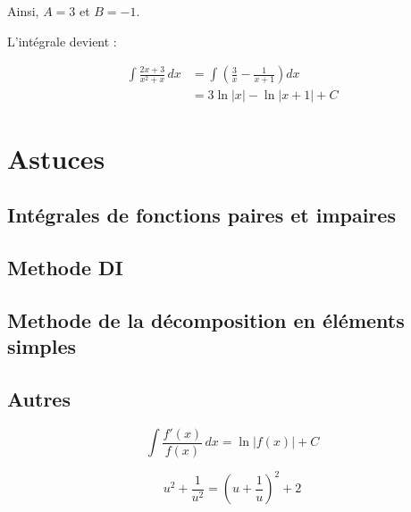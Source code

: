 Ainsi, $A = 3$ et $B = -1$.

L'intégrale devient :

\begin{align*}
    \int \frac{2x + 3}{x^2 + x} \, dx &= \int \left( \frac{3}{x} - \frac{1}{x + 1} \right) dx \\
    &= 3 \ln |x| - \ln |x + 1| + C
\end{align*}

\section{Astuces}

\subsection{Intégrales de fonctions paires et impaires}

\subsection{Methode DI}

\subsection{Methode de la décomposition en éléments simples}



\subsection{Autres}

\begin{equation*}
    \int \frac{f'(x)}{f(x)} \, dx = \ln |f(x)| + C
\end{equation*}

\begin{equation*}
    u^2 + \frac{1}{u^2} = \left( u + \frac{1}{u} \right)^2 + 2
\end{equation*}
